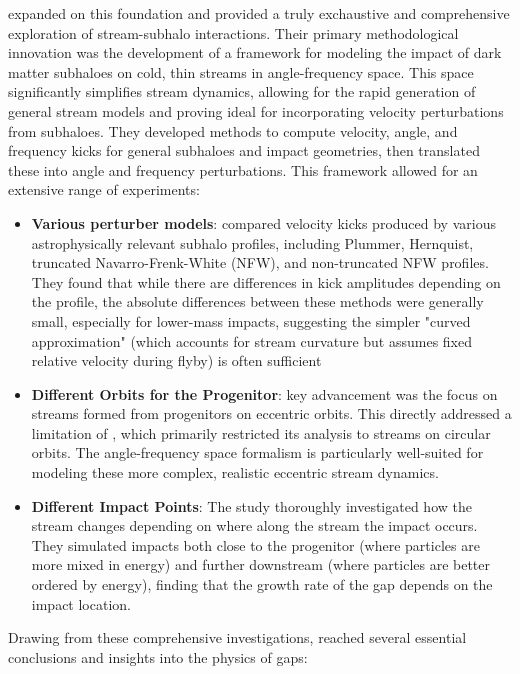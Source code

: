             \citet{2016MNRAS.457.3817S} expanded on this foundation and provided a truly exchaustive and comprehensive exploration of stream-subhalo interactions. Their primary methodological innovation was the development of a framework for modeling the impact of dark matter subhaloes on cold, thin streams in angle-frequency space. This space significantly simplifies stream dynamics, allowing for the rapid generation of general stream models and proving ideal for incorporating velocity perturbations from subhaloes. They developed methods to compute velocity, angle, and frequency kicks for general subhaloes and impact geometries, then translated these into angle and frequency perturbations. This framework allowed for an extensive range of experiments:
            \begin{itemize}
                \item \textbf{Various perturber models}: \citet{2016MNRAS.457.3817S} compared velocity kicks produced by various astrophysically relevant subhalo profiles, including Plummer, Hernquist, truncated Navarro-Frenk-White (NFW), and non-truncated NFW profiles. They found that while there are differences in kick amplitudes depending on the profile, the absolute differences between these methods were generally small, especially for lower-mass impacts, suggesting the simpler "curved approximation" (which accounts for stream curvature but assumes fixed relative velocity during flyby) is often sufficient
                \item \textbf{Different Orbits for the Progenitor}: key advancement was the focus on streams formed from progenitors on eccentric orbits. This directly addressed a limitation of \citet{2015MNRAS.450.1136E}, which primarily restricted its analysis to streams on circular orbits. The angle-frequency space formalism is particularly well-suited for modeling these more complex, realistic eccentric stream dynamics.
                \item \textbf{Different Impact Points}: The study thoroughly investigated how the stream changes depending on where along the stream the impact occurs. They simulated impacts both close to the progenitor (where particles are more mixed in energy) and further downstream (where particles are better ordered by energy), finding that the growth rate of the gap depends on the impact location. 
            \end{itemize}
            Drawing from these comprehensive investigations, \citet{2016MNRAS.457.3817S} reached several essential conclusions and insights into the physics of gaps:
